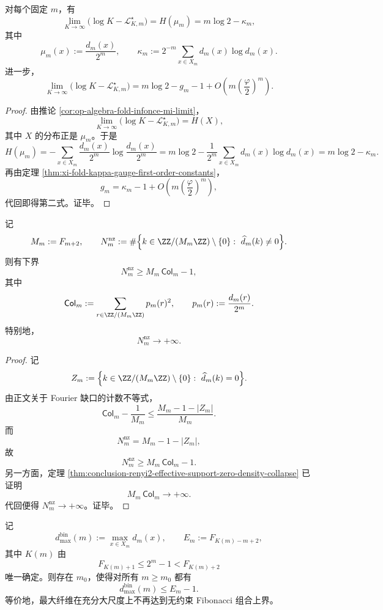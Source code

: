 \begin{corollary}[大负样本极限中的可见熵互补律]\label{cor:conclusion-infonce-large-k-visible-entropy-complement}
对每个固定 \(m\)，有
\[
\lim_{K\to\infty}\bigl(\log K-\mathcal L_{K,m}^\star\bigr)
=
H(\mu_m)
=
m\log 2-\kappa_m,
\]
其中
\[
\mu_m(x):=\frac{d_m(x)}{2^m},
\qquad
\kappa_m:=2^{-m}\sum_{x\in X_m}d_m(x)\log d_m(x).
\]
进一步，
\[
\lim_{K\to\infty}\bigl(\log K-\mathcal L_{K,m}^\star\bigr)
=
m\log 2-g_m-1+O\!\left(m\left(\frac{\varphi}{2}\right)^m\right).
\]
\end{corollary}

\begin{proof}
由推论 \ref{cor:op-algebra-fold-infonce-mi-limit}，
\[
\lim_{K\to\infty}\bigl(\log K-\mathcal L_{K,m}^\star\bigr)=H(X),
\]
其中 \(X\) 的分布正是 \(\mu_m\)。于是
\[
H(\mu_m)
=
-\sum_{x\in X_m}\frac{d_m(x)}{2^m}\log\frac{d_m(x)}{2^m}
=
m\log 2-\frac1{2^m}\sum_{x\in X_m}d_m(x)\log d_m(x)
=
m\log 2-\kappa_m.
\]
再由定理 \ref{thm:xi-fold-kappa-gauge-first-order-constants}，
\[
g_m=\kappa_m-1+O\!\left(m\left(\frac{\varphi}{2}\right)^m\right),
\]
代回即得第二式。证毕。
\end{proof}

\begin{corollary}\label{cor:conclusion-fourier-active-mode-count-diverges}
记
\[
M_m:=F_{m+2},
\qquad
N_m^{\mathrm{nz}}
:=
\#\Bigl\{
k\in \ZZ/(M_m\ZZ)\setminus\{0\}:\ \widehat d_m(k)\neq 0
\Bigr\}.
\]
则有下界
\[
N_m^{\mathrm{nz}}\ge M_m\,\mathsf{Col}_m-1,
\]
其中
\[
\mathsf{Col}_m:=\sum_{r\in \ZZ/(M_m\ZZ)}p_m(r)^2,
\qquad
p_m(r):=\frac{d_m(r)}{2^m}.
\]
特别地，
\[
N_m^{\mathrm{nz}}\longrightarrow +\infty.
\]
\end{corollary}

\begin{proof}
记
\[
Z_m:=\Bigl\{
k\in \ZZ/(M_m\ZZ)\setminus\{0\}:\ \widehat d_m(k)=0
\Bigr\}.
\]
由正文关于 Fourier 缺口的计数不等式，
\[
\mathsf{Col}_m-\frac1{M_m}
\le
\frac{M_m-1-|Z_m|}{M_m}.
\]
而
\[
N_m^{\mathrm{nz}}=M_m-1-|Z_m|,
\]
故
\[
N_m^{\mathrm{nz}}\ge M_m\,\mathsf{Col}_m-1.
\]
另一方面，定理 \ref{thm:conclusion-renyi2-effective-support-zero-density-collapse} 已证明
\[
M_m\,\mathsf{Col}_m\to+\infty.
\]
代回便得 \(N_m^{\mathrm{nz}}\to+\infty\)。证毕。
\end{proof}

\begin{proposition}\label{prop:conclusion-foldbin-fibonacci-envelope-eventual-strict-failure}
记
\[
d_{\max}^{\mathrm{bin}}(m):=\max_{x\in X_m}d_m(x),
\qquad
E_m:=F_{K(m)-m+2},
\]
其中 \(K(m)\) 由
\[
F_{K(m)+1}\le 2^m-1<F_{K(m)+2}
\]
唯一确定。则存在 \(m_0\)，使得对所有 \(m\ge m_0\) 都有
\[
d_{\max}^{\mathrm{bin}}(m)\le E_m-1.
\]
等价地，最大纤维在充分大尺度上不再达到无约束 Fibonacci 组合上界。
\end{proposition}

